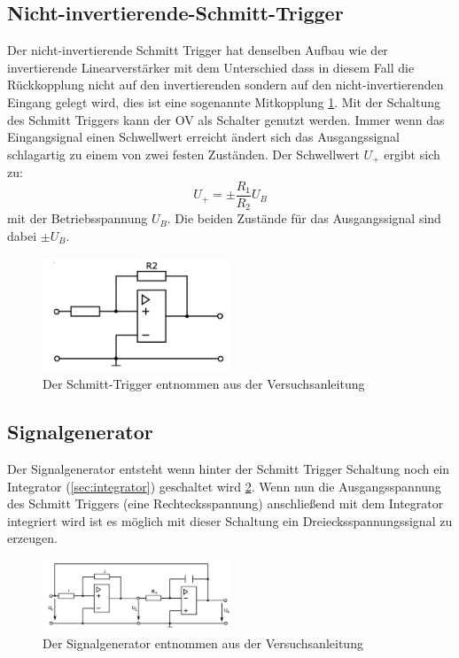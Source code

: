     \subsection{Nicht-invertierende-Schmitt-Trigger}
        Der nicht-invertierende Schmitt Trigger hat denselben Aufbau wie der invertierende Linearverstärker mit dem Unterschied dass in diesem Fall die Rückkopplung nicht auf den invertierenden sondern auf den nicht-invertierenden Eingang gelegt wird, dies ist eine sogenannte Mitkopplung \ref{fig:schmitt_trigger}.
        Mit der Schaltung des Schmitt Triggers kann der OV als Schalter genutzt werden.
        Immer wenn das Eingangsignal einen Schwellwert erreicht ändert sich das Ausgangssignal schlagartig zu einem von zwei festen Zuständen.
        Der Schwellwert $U_+$ ergibt sich zu:
        \begin{equation*}
            U_+  = \pm \frac{R_1}{R_2}U_B
        \end{equation*}
        mit der Betriebsspannung $U_B$. 
        Die beiden Zustände für das Ausgangssignal sind dabei $\pm U_B$.
        \begin{figure}[ht]
            \centering
            \includegraphics[width = 0.5\textwidth]{bilder/schmitt_trigger.png}
            \caption{Der Schmitt-Trigger entnommen aus der Versuchsanleitung}
            \label{fig:schmitt_trigger}
        \end{figure}
    \subsection{Signalgenerator}
        Der Signalgenerator entsteht wenn hinter der Schmitt Trigger Schaltung noch ein Integrator (\ref{sec:integrator}) geschaltet wird \ref{fig:signalgenerator}.
        Wenn nun die Ausgangsspannung des Schmitt Triggers (eine Rechtecksspannung) anschließend mit dem Integrator integriert wird ist es möglich mit dieser Schaltung ein Dreiecksspannungssignal zu erzeugen.
        \begin{figure}[ht]
            \centering
            \includegraphics[width = 0.5\textwidth]{bilder/signalgenerator.png}
            \caption{Der Signalgenerator entnommen aus der Versuchsanleitung}
            \label{fig:signalgenerator}
        \end{figure}
